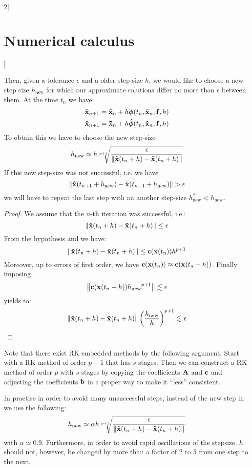 \documentclass[../../../main_math.tex]{subfiles}
\begin{document}
\begin{multicols}{2}[\section{Numerical calculus}]
\begin{theorem}
    Then, given a tolerance $\epsilon$ and a older step-size $h$, we would like to choose a new step size $h_\mathrm{new}$ for which our approximate solutions differ no more than $\epsilon$ between them. At the time $t_n$ we have:
    \begin{align*}
      \boldsymbol{\mathrm{\tilde{x}}}_{n+1} & =\boldsymbol{\mathrm{\tilde{x}}}_n+h\boldsymbol{\mathrm{\phi}}(t_n,\boldsymbol{\mathrm{\tilde{x}}}_n,\boldsymbol{\mathrm{f}},h)   \\
      \boldsymbol{\mathrm{\hat{x}}}_{n+1}   & =\boldsymbol{\mathrm{\tilde{x}}}_n+h\boldsymbol{\mathrm{\hat\phi}}(t_n,\boldsymbol{\mathrm{\hat{x}}}_n,\boldsymbol{\mathrm{f}},h)
    \end{align*}
    To obtain this we have to choose the new step-size
    \begin{equation}\label{NC:RFF}
      h_{\mathrm{new}}\simeq h\sqrt[p+1]{\frac{\epsilon}{\left\|\boldsymbol{\mathrm{\hat{x}}}(t_n+h)-\boldsymbol{\mathrm{\tilde{x}}}(t_n+h)\right\|}}
    \end{equation}
    If this new step-size was not successful, i.e. we have $$\norm{\vf{\hat{x}}(t_{n+1}+h_\mathrm{new})-\vf{\tilde{x}}(t_{n+1}+h_\mathrm{new})}>\epsilon$$ we will have to repeat the last step with an another step-size $h_{\mathrm{new}}^*<h_{\mathrm{new}}$.
  \end{theorem}
  \begin{proof}
    We assume that the $n$-th iteration was successful, i.e.:
    $$\left\|\boldsymbol{\mathrm{\hat{x}}}(t_n+h)-\boldsymbol{\mathrm{\tilde{x}}}(t_n+h)\right\|\leq\epsilon$$
    From the hypothesis and  we have:
    $$\left\|\boldsymbol{\mathrm{\hat{x}}}(t_n+h)-\boldsymbol{\mathrm{\tilde{x}}}(t_n+h)\right\|\leq \boldsymbol{\mathrm{c}}(\boldsymbol{\mathrm{x}}(t_n))h^{p+1}$$
    Moreover, up to errors of first order, we have $\boldsymbol{\mathrm{c}}(\boldsymbol{\mathrm{x}}(t_n))\approx\boldsymbol{\mathrm{c}}(\boldsymbol{\mathrm{x}}(t_{n}+h))$. Finally imposing
    $$\left\|\boldsymbol{\mathrm{c}}(\boldsymbol{\mathrm{x}}(t_{n}+h)){h_\mathrm{new}}^{p+1}\right\|\lesssim\epsilon$$
    yields to:
    $$\left\|\boldsymbol{\mathrm{\hat{x}}}(t_n+h)-\boldsymbol{\mathrm{\tilde{x}}}(t_n+h)\right\|{\left(\frac{h_{\mathrm{new}}}{h}\right)}^{p+1}\lesssim\epsilon$$
  \end{proof}
  \begin{remark}
    Note that there exist RK embedded methods by the following argument. Start with a RK method of order $p+1$ that has $s$ stages. Then we can construct a RK method of order $p$ with $s$ stages by copying the coefficients $\boldsymbol{\mathrm{A}}$ and $\boldsymbol{\mathrm{c}}$ and adjusting the coefficients $\boldsymbol{\mathrm{b}}$ in a proper way to make it ``less'' consistent.
  \end{remark}
  \begin{remark}
    In practise in order to avoid many unsuccessful steps, instead of the new step in  we use the following:
    $$h_{\mathrm{new}}\simeq\alpha h\sqrt[p+1]{\frac{\epsilon}{\left\|\boldsymbol{\mathrm{\hat{x}}}(t_n+h)-\boldsymbol{\mathrm{\tilde{x}}}(t_n+h)\right\|}}$$
    with $\alpha\simeq 0.9$.
    Furthermore, in order to avoid rapid oscillations of the stepsize, $h$ should not, however, be changed by more than a factor of 2 to 5 from one step to the next.
  \end{remark}

\end{multicols}
\end{document}
